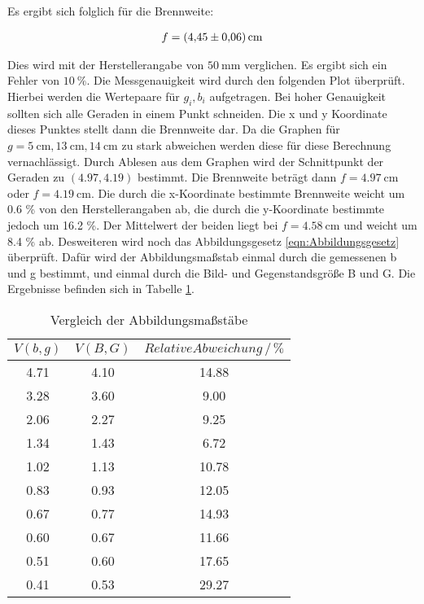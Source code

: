 Es ergibt sich folglich für die Brennweite:

\begin{align*}
  f = \SI{4.45\pm0.06}{\centi\metre}
\end{align*}

Dies wird mit der Herstellerangabe von $\SI{50}{\milli\metre}$ verglichen.
Es ergibt sich ein Fehler von $\SI{10}{\percent}$.
Die Messgenauigkeit wird durch den folgenden Plot überprüft.
Hierbei werden die Wertepaare für $g_i, b_i$ aufgetragen.
Bei hoher Genauigkeit sollten sich alle Geraden in einem Punkt schneiden. Die x und y Koordinate dieses Punktes stellt dann die Brennweite dar.
Da die Graphen für $g = \SI{5}{\centi\metre}, \SI{13}{\centi\metre}, \SI{14}{\centi\metre}$ zu stark abweichen werden diese für diese Berechnung vernachlässigt.
Durch Ablesen aus dem Graphen wird der Schnittpunkt der Geraden zu $(4.97,4.19)$ bestimmt. Die Brennweite beträgt dann $f=\SI{4.97}{\centi\metre}$ oder
$f=\SI{4.19}{\centi\metre}$. Die durch die x-Koordinate bestimmte Brennweite weicht um 0.6 \% von den Herstellerangaben ab, die durch die y-Koordinate bestimmte
jedoch um 16.2 \%. Der Mittelwert der beiden liegt bei $f=\SI{4.58}{\centi\metre}$ und weicht um 8.4 \% ab. Desweiteren wird noch das Abbildungsgesetz \eqref{eqn:Abbildungsgesetz} überprüft.
Dafür wird der Abbildungsmaßstab einmal durch die gemessenen b und g bestimmt, und einmal durch die Bild- und Gegenstandsgröße B und G.
Die Ergebnisse befinden sich in Tabelle \ref{tab:V}.

\begin{table}
  \centering
  \caption{Vergleich der Abbildungsmaßstäbe}
  \label{tab:V}
  \begin{tabular}{c c c }
    \toprule
    $V(b,g)$ & $V(B,G)$ & $Relative Abweichung \, / \, \%$ \\
    \midrule
    4.71 & 4.10 & 14.88\\
    3.28 & 3.60 & 9.00\\
    2.06 & 2.27 & 9.25\\
    1.34 & 1.43 & 6.72\\
    1.02 & 1.13 & 10.78\\
    0.83 & 0.93 & 12.05\\
    0.67 & 0.77 & 14.93\\
    0.60 & 0.67 & 11.66\\
    0.51 & 0.60 & 17.65\\
    0.41 & 0.53 & 29.27\\
    \bottomrule
  \end{tabular}
\end{table}

